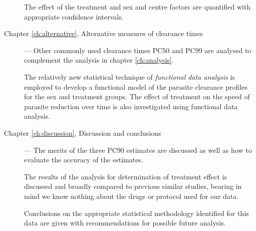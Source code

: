 \begin{description}
The effect of the treatment and sex and centre factors are quantified with appropriate confidence intervals.
\item[Chapter \ref{ch:alternative}, Alternative measures of clearance times] --- Other commonly used clearance times PC50 and PC99 are analysed to complement the analysis in chapter \ref{ch:analysis}.

The relatively new statistical technique of \emph{functional data analysis} is employed to develop a functional model of the parasite clearance profiles for the sex and treatment groups. The effect of treatment on the speed of parasite reduction over time is also investigated using functional data analysis. 
 
\item[Chapter \ref{ch:discussion}, Discussion and conclusions] --- The merits of the three PC90 estimates are discussed as well as how to evaluate the accuracy of the estimates.

The results of the analysis for determination of treatment effect is discussed and broadly compared to previous similar studies, bearing in mind we know nothing about the drugs or protocol used for our data.  

Conclusions on the appropriate statistical methodology identified for this data are given with recommendations for possible future analysis.
\end{description}
